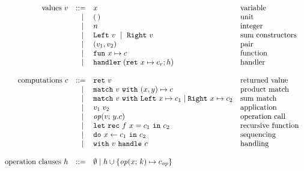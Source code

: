 
\[
	\begin{array}{rrll}
		\text{values}~v
		 & ::=   & x                      			& \text{variable}          \\
		 & \vsep & \unit												& \text{unit}							 \\
		 & \vsep & n														& \text{integer}					 \\
		 & \vsep & \inleft{v}~\vsep~\inright{v} & \text{sum constructors}  \\
		 & \vsep & \pair{v_1}{v_2}							&	\text{pair}						 	 \\
		 & \vsep & \fun{x}{c}             			& \text{function}          \\
		 & \vsep & \handler{h}      						& \text{handler}           \\
		 \\
		 \text{computations}~c
		 & ::=   & \return{v}             		& \text{returned value}    		\\
		 & \vsep & \match{v} \pair{x}{y} \mapsto c 	 & \text{product match} \\
		 & \vsep & \match{v} \inleft{x} \mapsto c_1 
		 	 				 \vsep     \inright{x} \mapsto c_2 & \text{sum match} 		\\
		 & \vsep & \apply{v_1}{v_2}       		& \text{application}       		\\
		 & \vsep & \operation{v}{y.c}     		& \text{operation call}    		\\
		 & \vsep & \letrec{f}{x}{c_1} {c_2}		& \text{recursive function} 	\\
		 & \vsep & \dobind{x}{c_1}{c_2}   		& \text{sequencing}        		\\
		 & \vsep & \withhandle{v}{c}      		& \text{handling}					 		\\
		 \\
		 \text{operation clauses}~h
			& ::=   & \emptyhcases 
			\vsep 		h \union \set{\operation{x}{k} \mapsto c_{\op}} 	\\
		\end{array}
		\]
